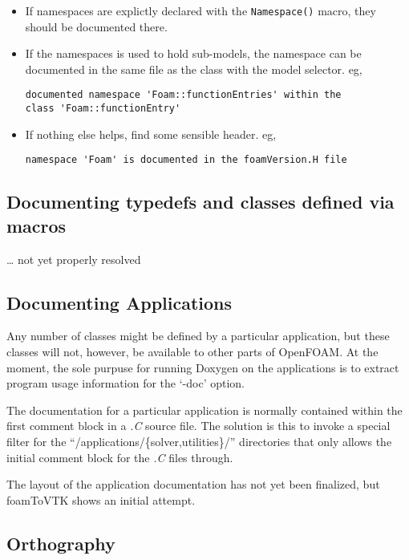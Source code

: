 \documentclass[11pt]{article}
\begin{document}
\begin{itemize}
\item If namespaces are explictly declared with the \texttt{Namespace()} macro,
      they should be documented there.
\item If the namespaces is used to hold sub-models, the namespace can be
      documented in the same file as the class with the model selector.
      eg,

\begin{verbatim}
documented namespace 'Foam::functionEntries' within the
class 'Foam::functionEntry'
\end{verbatim}
\item If nothing else helps, find some sensible header.
      eg,

\begin{verbatim}
namespace 'Foam' is documented in the foamVersion.H file
\end{verbatim}
\end{itemize}
\subsection{Documenting typedefs and classes defined via macros}
\label{sec-1-15}

    \ldots{} not yet properly resolved
\subsection{Documenting Applications}
\label{sec-1-16}

    Any number of classes might be defined by a particular application, but
    these classes will not, however, be available to other parts of
    OpenFOAM. At the moment, the sole purpuse for running Doxygen on the
    applications is to extract program usage information for the `-doc'
    option.

    The documentation for a particular application is normally contained
    within the first comment block in a \emph{.C} source file. The solution is this
    to invoke a special filter for the ``/applications/\{solver,utilities\}/''
    directories that only allows the initial comment block for the \emph{.C} files
    through.

    The layout of the application documentation has not yet been finalized,
    but foamToVTK shows an initial attempt.
\subsection{Orthography}
\label{sec-1-17}
\end{document}
